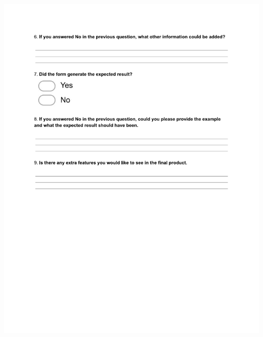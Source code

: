 \newpage
\begin{centering}
\includegraphics[trim = 40 160 0 60,scale=0.9]{forms/prototypeEvaluationFormPage2.pdf}
\end{centering}

\newpage

